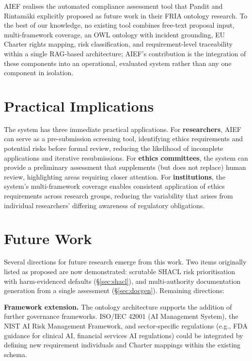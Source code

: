 AIEF realises the automated compliance assessment tool that Pandit and Rintam\"{a}ki \cite{pandit2024fria} explicitly proposed as future work in their FRIA ontology research. To the best of our knowledge, no existing tool combines free-text proposal input, multi-framework coverage, an OWL ontology with incident grounding, EU Charter rights mapping, risk classification, and requirement-level traceability within a single RAG-based architecture; AIEF's contribution is the integration of these components into an operational, evaluated system rather than any one component in isolation.


\section{Practical Implications}

The system has three immediate practical applications. For \textbf{researchers}, AIEF can serve as a pre-submission screening tool, identifying ethics requirements and potential risks before formal review, reducing the likelihood of incomplete applications and iterative resubmissions. For \textbf{ethics committees}, the system can provide a preliminary assessment that supplements (but does not replace) human review, highlighting areas requiring closer attention. For \textbf{institutions}, the system's multi-framework coverage enables consistent application of ethics requirements across research groups, reducing the variability that arises from individual researchers' differing awareness of regulatory obligations.


\section{Future Work}

Several directions for future research emerge from this work. Two items originally listed as proposed are now demonstrated: scrutable SHACL risk prioritisation with harm-evidenced defaults (\S\ref{sec:shacl}), and multi-authority documentation generation from a single assessment (\S\ref{sec:docgen}). Remaining directions:

\textbf{Framework extension.} The ontology architecture supports the addition of further governance frameworks. ISO/IEC 42001 (AI Management System), the NIST AI Risk Management Framework, and sector-specific regulations (e.g., FDA guidance for clinical AI, financial services AI regulations) could be integrated by defining new requirement individuals and Charter mappings within the existing schema.

